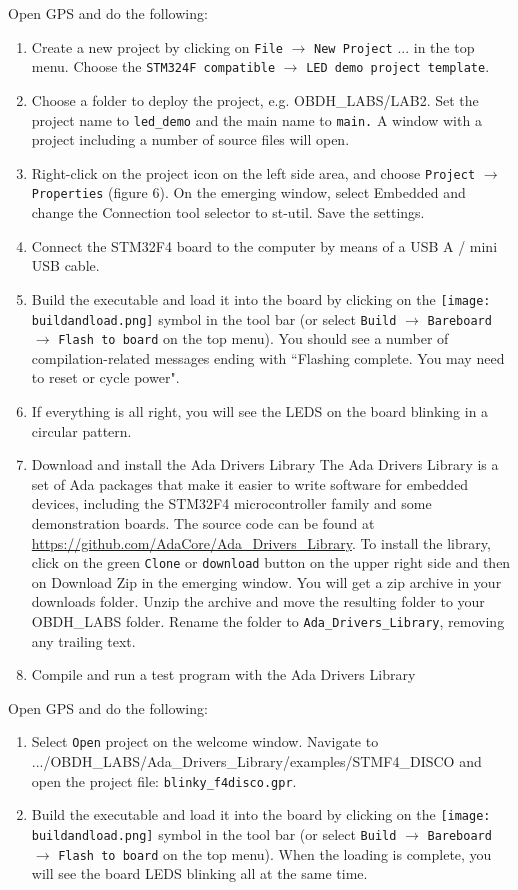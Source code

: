 Open GPS and do the following:
\begin{enumerate}
\item Create a new project by clicking on {\tt File} $\rightarrow$ {\tt New Project} ... in the top menu. Choose the {\tt STM324F compatible} $\rightarrow$ {\tt LED demo project template}.
\item	Choose a folder to deploy the project, e.g. OBDH\_LABS/LAB2. Set the project name to {\tt led\_demo} and the main name to {\tt main.} A window with a project including a number of source files will open.
\item	Right-click on the project icon on the left side area, and choose {\tt Project} $\rightarrow$ {\tt Properties} (figure 6). On the emerging window, select Embedded and change the Connection tool selector to st-util. Save the settings.
\item	Connect the STM32F4 board to the computer by means of a USB A / mini USB cable.
\item	Build the executable and load it into the board by clicking on the
\hbox{\texttt{[image: buildandload.png]}} symbol in the tool bar (or select {\tt Build} $\rightarrow$ {\tt Bareboard} $\rightarrow$ {\tt Flash to board} on the top menu). You should see a number of compilation-related messages ending with ``Flashing complete. You may need to reset or cycle power".
\item	If everything is all right, you will see the LEDS on the board blinking in a circular pattern.
\item Download and install the Ada Drivers Library
The Ada Drivers Library is a set of Ada packages that make it easier to write software for embedded devices, including the STM32F4 microcontroller family and some demonstration boards. The source code can be found at \url{https://github.com/AdaCore/Ada\_Drivers\_Library}. To install the library, click on the green {\tt Clone} or {\tt download} button on the upper right side and then on Download Zip in the emerging window. You will get a zip archive in your downloads folder. Unzip the archive and move the resulting folder to your OBDH\_LABS folder. Rename the folder to {\tt Ada\_Drivers\_Library}, removing any trailing text.
\item Compile and run a test program with the Ada Drivers Library
\end{enumerate}
Open GPS and do the following:
\begin{enumerate}
\item Select {\tt Open} project on the welcome window. Navigate to .../OBDH\_LABS/\-Ada\_Drivers\_Li\-brary/\-examples/STMF4\_DISCO and open the project file: {\tt blinky\-\_f4disco.gpr}.
\item	Build the executable and load it into the board by clicking on the \hbox{\texttt{[image: buildandload.png]}} symbol in the tool bar (or select {\tt Build} $\rightarrow$ {\tt Bareboard} $\rightarrow$ {\tt Flash to board} on the top menu). When the loading is complete, you will see the board LEDS blinking all at the same time.
\end{enumerate}

